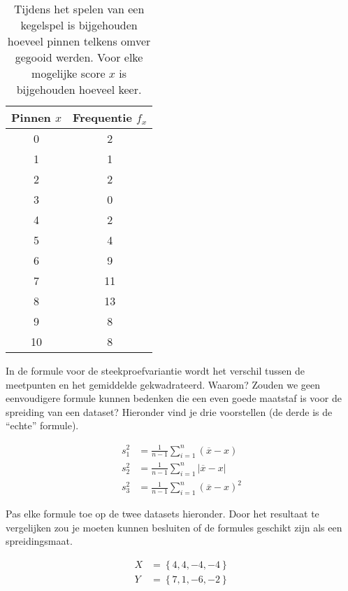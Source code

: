 \begin{table}
  \centering
  \begin{tabular}{cc}
  	\toprule
  	Pinnen $x$ & Frequentie $f_{x}$ \\
  	\midrule
  	    0      &         2          \\
  	    1      &         1          \\
  	    2      &         2          \\
  	    3      &         0          \\
  	    4      &         2          \\
  	    5      &         4          \\
  	    6      &         9          \\
  	    7      &         11         \\
  	    8      &         13         \\
  	    9      &         8          \\
  	    10     &         8          \\
  	\bottomrule
  \end{tabular}
  \caption{Tijdens het spelen van een kegelspel is bijgehouden hoeveel pinnen telkens omver gegooid werden. Voor elke mogelijke score $x$ is bijgehouden hoeveel keer.}
  \label{tab:pinfreq}
\end{table}

\begin{exercise}
  \label{ex:variance-formula}
  In de formule voor de steekproefvariantie wordt het verschil tussen de meetpunten en het gemiddelde gekwadrateerd. Waarom? Zouden we geen eenvoudigere formule kunnen bedenken die een even goede maatstaf is voor de spreiding van een dataset? Hieronder vind je drie voorstellen (de derde is de ``echte'' formule).

  \begin{align}
    s^{2}_{1} &= \frac{1}{n-1} \sum_{i=1}^{n} (\overline{x} - x) \\
    s^{2}_{2} &= \frac{1}{n-1} \sum_{i=1}^{n} \left| \overline{x} - x\right| \\
    s^{2}_{3} &= \frac{1}{n-1} \sum_{i=1}^{n} (\overline{x} - x)^{2}
  \end{align}

  Pas elke formule toe op de twee datasets hieronder. Door het resultaat te vergelijken zou je moeten kunnen besluiten of de formules geschikt zijn als een spreidingsmaat.
  
  \begin{align*}
    X &= \left\{ 4,4,-4,-4 \right\} \\
    Y &= \left\{ 7,1,-6,-2 \right\}
  \end{align*}

\end{exercise}

